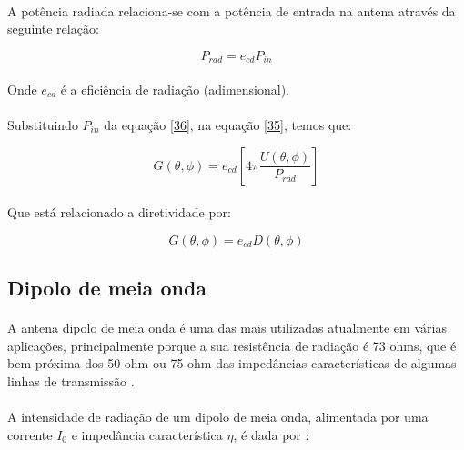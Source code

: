 \paragraph{}A potência radiada relaciona-se com a potência de entrada na antena através da seguinte relação:

\begin{equation}
    P_{rad} = e_{cd}P_{in}
    \label{36}
\end{equation}

\paragraph{}Onde $e_{cd}$ é a eficiência de radiação (adimensional).

\paragraph{}Substituindo $P_{in}$ da equação \ref{36}, na equação \ref{35}, temos que:

\begin{equation}
    G(\theta, \phi) = e_{cd}[4\pi\frac{U(\theta, \phi)}{P_{rad}}]
    \label{37}
\end{equation}

\paragraph{}Que está relacionado a diretividade por:

\begin{equation}
    G(\theta,\phi) = e_{cd}D(\theta,\phi)
    \label{39}
\end{equation}

\subsection{Dipolo de meia onda}

\paragraph{}A antena dipolo de meia onda é uma das mais utilizadas atualmente em várias aplicações, principalmente porque a sua resistência de radiação é 73 ohms, que é bem próxima dos 50-ohm ou 75-ohm das impedâncias características de algumas linhas de transmissão \citep{balanis}.

\paragraph{} A intensidade de radiação de um dipolo de meia onda, alimentada por uma corrente $I_0$ e impedância característica $\eta$, é dada por \citep{balanis}:


